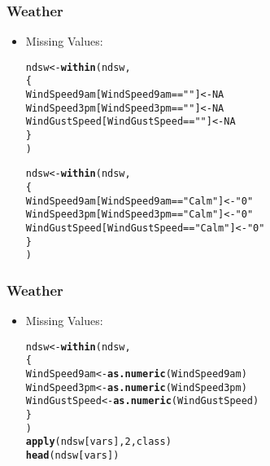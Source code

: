 \documentclass{beamer}\usepackage[]{graphicx}\usepackage[]{color}
\makeatletter
\newcommand{\hlnum}[1]{\textcolor[rgb]{0.686,0.059,0.569}{#1}}%
\newcommand{\hlstr}[1]{\textcolor[rgb]{0.192,0.494,0.8}{#1}}%
\newcommand{\hlopt}[1]{\textcolor[rgb]{0,0,0}{#1}}%
\newcommand{\hlstd}[1]{\textcolor[rgb]{0.345,0.345,0.345}{#1}}%
\newcommand{\hlkwb}[1]{\textcolor[rgb]{0.69,0.353,0.396}{#1}}%
\newcommand{\hlkwd}[1]{\textcolor[rgb]{0.737,0.353,0.396}{\textbf{#1}}}%
\newenvironment{kframe}{%
 \def\at@end@of@kframe{}%
 \ifinner\ifhmode%
  \def\at@end@of@kframe{\end{minipage}}%
  \begin{minipage}{\columnwidth}%
 \fi\fi%
 \def\FrameCommand##1{\hskip\@totalleftmargin \hskip-\fboxsep
 \colorbox{shadecolor}{##1}\hskip-\fboxsep
     \hskip-\linewidth \hskip-\@totalleftmargin \hskip\columnwidth}%
 \MakeFramed {\advance\hsize-\width
   \@totalleftmargin\z@ \linewidth\hsize
   \@setminipage}}%
 {\par\unskip\endMakeFramed%
 \at@end@of@kframe}
\newenvironment{knitrout}{}{} %
\makeatother
\begin{document}
\begin{frame}[fragile]
\frametitle{Weather}
\begin{itemize}
\item Missing Values:
\begin{knitrout}
\color{fgcolor}\begin{kframe}
\begin{alltt}
\hlstd{ndsw} \hlkwb{<-} \hlkwd{within}\hlstd{(ndsw,}
  \hlstd{\{}
  \hlstd{WindSpeed9am[WindSpeed9am} \hlopt{==} \hlstr{""}\hlstd{]} \hlkwb{<-} \hlnum{NA}
  \hlstd{WindSpeed3pm[WindSpeed3pm} \hlopt{==} \hlstr{""}\hlstd{]} \hlkwb{<-} \hlnum{NA}
  \hlstd{WindGustSpeed[WindGustSpeed} \hlopt{==} \hlstr{""}\hlstd{]} \hlkwb{<-} \hlnum{NA}
  \hlstd{\}}
\hlstd{)}
\end{alltt}
\end{kframe}
\end{knitrout}
\begin{knitrout}
\color{fgcolor}\begin{kframe}
\begin{alltt}
\hlstd{ndsw} \hlkwb{<-} \hlkwd{within}\hlstd{(ndsw,}
  \hlstd{\{}
  \hlstd{WindSpeed9am[WindSpeed9am} \hlopt{==} \hlstr{"Calm"}\hlstd{]} \hlkwb{<-} \hlstr{"0"}
  \hlstd{WindSpeed3pm[WindSpeed3pm} \hlopt{==} \hlstr{"Calm"}\hlstd{]} \hlkwb{<-} \hlstr{"0"}
  \hlstd{WindGustSpeed[WindGustSpeed} \hlopt{==} \hlstr{"Calm"}\hlstd{]} \hlkwb{<-} \hlstr{"0"}
  \hlstd{\}}
\hlstd{)}
\end{alltt}
\end{kframe}
\end{knitrout}
\end{itemize}
\end{frame}

\begin{frame}[fragile]
\frametitle{Weather}
\begin{itemize}
\item Missing Values:
\begin{knitrout}
\color{fgcolor}\begin{kframe}
\begin{alltt}
\hlstd{ndsw} \hlkwb{<-} \hlkwd{within}\hlstd{(ndsw,}
  \hlstd{\{}
  \hlstd{WindSpeed9am} \hlkwb{<-} \hlkwd{as.numeric}\hlstd{(WindSpeed9am)}
  \hlstd{WindSpeed3pm} \hlkwb{<-} \hlkwd{as.numeric}\hlstd{(WindSpeed3pm)}
  \hlstd{WindGustSpeed} \hlkwb{<-} \hlkwd{as.numeric}\hlstd{(WindGustSpeed)}
  \hlstd{\}}
\hlstd{)}
\hlkwd{apply}\hlstd{(ndsw[vars],} \hlnum{2}\hlstd{, class)}
\hlkwd{head}\hlstd{(ndsw[vars])}
\end{alltt}
\end{kframe}
\end{knitrout}
\end{itemize}
\end{frame}
\end{document}
